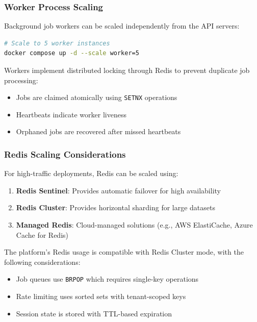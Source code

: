 \subsubsection{Worker Process Scaling}

Background job workers can be scaled independently from the API servers:

\begin{lstlisting}[language=bash, caption=Scaling worker processes]
# Scale to 5 worker instances
docker compose up -d --scale worker=5
\end{lstlisting}

Workers implement distributed locking through Redis to prevent duplicate job processing:
\begin{itemize}
    \item Jobs are claimed atomically using \texttt{SETNX} operations
    \item Heartbeats indicate worker liveness
    \item Orphaned jobs are recovered after missed heartbeats
\end{itemize}

\subsubsection{Redis Scaling Considerations}

For high-traffic deployments, Redis can be scaled using:

\begin{enumerate}
    \item \textbf{Redis Sentinel}: Provides automatic failover for high availability
    \item \textbf{Redis Cluster}: Provides horizontal sharding for large datasets
    \item \textbf{Managed Redis}: Cloud-managed solutions (e.g., AWS ElastiCache, Azure Cache for Redis)
\end{enumerate}

The platform's Redis usage is compatible with Redis Cluster mode, with the following considerations:
\begin{itemize}
    \item Job queues use \texttt{BRPOP} which requires single-key operations
    \item Rate limiting uses sorted sets with tenant-scoped keys
    \item Session state is stored with TTL-based expiration
\end{itemize}


